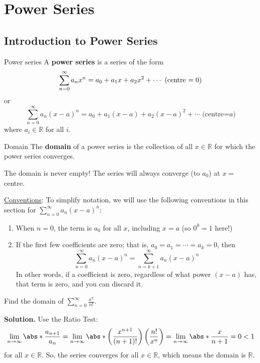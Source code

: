 \chapter{Power Series}
\section{Introduction to Power Series}
\begin{Definition}{Power series}{}
    A \textbf{power series} is a series of the form
    \[ \sum\limits_{n=0}^{\infty} a_n x^n=a_0+a_1x+a_2x^2+\cdots\text{ (centre $ =0$)} \]
    or
    \[ \sum\limits_{n=0}^{\infty} a_n (x-a)^n=a_0+a_1(x-a)+a_2(x-a)^2+\cdots\text{ (centre=$a$)} \]
    where $ a_i\in\mathbb{R} $ for all $ i $.
\end{Definition}
\begin{Definition}{Domain}{}
    The \textbf{domain} of a power series is the collection of all
    $ x\in\mathbb{R} $ for which the power series converges.
\end{Definition}

\begin{Remark}{}{}
    The domain is never empty! The series will always converge (to $ a_0 $)
    at $ x= $ centre.
\end{Remark}
\underline{Conventions}: To simplify notation, we will use the following
conventions in this section for $ \sum\limits_{n=0}^{\infty} a_n(x-a)^n $:
\begin{enumerate}[label=(\Roman*)]
    \item When $ n=0 $, the term is $ a_0 $ for all $ x $, including $ x=a $
          (so $ 0^0=1 $ here!)
    \item If the first few coefficients are zero; that is, $ a_0=a_1=\cdots=a_k=0 $,
          then
          \[ \sum\limits_{n=0}^{\infty} a_n(x-a)^n=\sum\limits_{n=k+1}^{\infty} a_n(x-a)^n \]
          In other words, if a coefficient is zero, regardless of what power
          $ (x-a) $ has, that term is zero, and you can discard it.
\end{enumerate}

\begin{Example}{}{}
    Find the domain of $ \displaystyle \sum\limits_{n=0}^{\infty} \frac{x^n}{n!} $.

    \textbf{Solution.} Use the Ratio Test:
    \[ \lim\limits_{{n} \to {\infty}} \abs*{\frac{a_{n+1}}{a_n}}
        =\lim\limits_{{n} \to {\infty}} \abs*{\left( \frac{x^{n+1}}{(n+1)!} \right)
            \left( \frac{n!}{x^n} \right)}
        =\lim\limits_{{n} \to {\infty}} \abs*{\frac{x}{n+1}}
        =0
        <1 \]
    for all $ x\in\mathbb{R} $. So, the series converges for all $ x\in\mathbb{R} $,
    which means the domain is $ \mathbb{R} $.
\end{Example}

